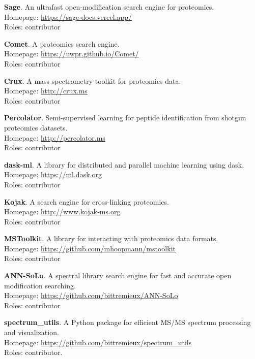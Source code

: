 \documentclass[11pt]{article}
\newcommand{\myref}[1]{\href{#1}{\url{#1}}}
\begin{document}
{{\begin{etaremune}
  \item \textbf{Sage}. An ultrafast open-modification search engine for proteomics. \\
  Homepage: \myref{https://sage-docs.vercel.app/} \\
  Roles: contributor

  \item \textbf{Comet}. A proteomics search engine. \\
  Homepage: \myref{https://uwpr.github.io/Comet/} \\
  Roles: contributor

  \item \textbf{Crux}. A mass spectrometry toolkit for proteomics data. \\
  Homepage: \myref{http://crux.ms} \\
  Roles: contributor

  \item \textbf{Percolator}. Semi-supervised learning for peptide
  identification from shotgun proteomics datasets. \\
  Homepage: \myref{http://percolator.ms} \\
  Roles: contributor

  \item \textbf{dask-ml}. A library for distributed and parallel machine
  learning using dask. \\
  Homepage: \myref{https://ml.dask.org} \\
  Roles: contributor

  \item \textbf{Kojak}. A search engine for cross-linking proteomics. \\
  Homepage: \myref{http://www.kojak-ms.org} \\
  Roles: contributor

  \item \textbf{MSToolkit}. A library for interacting with proteomics data formats. \\
  Homepage: \myref{https://github.com/mhoopmann/mstoolkit} \\
  Roles: contributor

  \item \textbf{ANN-SoLo}. A spectral library search engine for fast and
  accurate open modification searching. \\
  Homepage: \myref{https://github.com/bittremieux/ANN-SoLo} \\
  Roles: contributor
   
  \item \textbf{spectrum\_utils}. A Python package for efficient MS/MS spectrum
  processing and visualization. \\
  Homepage: \myref{https://github.com/bittremieux/spectrum_utils} \\
  Roles: contributor.


\end{etaremune}}}
\end{document}

